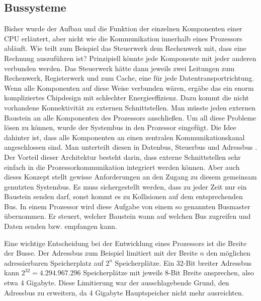 \documentclass[a4paper,12pt]{article}
\begin{document}
\subsection{Bussysteme}
Bisher wurde der Aufbau und die Funktion der einzelnen Komponenten einer CPU erläutert, aber nicht wie die Kommunikation innerhalb eines Prozessors abläuft. Wie teilt zum Beispiel das Steuerwerk dem Rechenwerk mit, dass eine Rechnung auszuführen ist? Prinzipiell könnte jede Komponente mit jeder anderen verbunden werden. Das Steuerwerk hätte dann jeweils zwei Leitungen zum Rechenwerk, Registerwerk und zum Cache, eine für jede Datentransportrichtung. Wenn alle Komponenten auf diese Weise verbunden wären, ergäbe das ein enorm kompliziertes Chipdesign mit schlechter Energieeffizienz. Dazu kommt die nicht vorhandene Konnektivität zu externen Schnittstellen. Man müsste jeden externen Baustein an alle Komponenten des Prozessors anschließen\cite{mikroprozessortechnik2011}. Um all diese Probleme lösen zu können, wurde der Systembus in den Prozessor eingefügt. Die Idee dahinter ist, dass alle Komponenten an einen zentralen Kommunikationskanal angeschlossen sind. Man unterteilt diesen in Datenbus, Steuerbus und Adressbus \cite[S.62]{mikroprozessortechnik2011}. Der Vorteil dieser Architektur besteht darin, dass externe Schnittstellen sehr einfach in die Prozessorkommunikation integriert werden können. Aber auch dieses Konzept stellt gewisse Anforderungen an den Zugang zu diesem gemeinsam genutzten Systembus. Es muss sichergestellt werden, dass zu jeder Zeit nur ein Baustein senden darf, sonst kommt es zu Kollisionen auf dem entsprechenden Bus. In einem Prozessor wird diese Aufgabe von einem so genannten Busmaster übernommen. Er steuert, welcher Baustein wann auf welchen Bus zugreifen  und Daten senden bzw. empfangen kann.
\par\smallskip\noindent
Eine wichtige Entscheidung bei der Entwicklung eines Prozessors ist die Breite der Busse. Der Adressbus zum Beispiel limitiert mit der Breite $n$ den möglichen adressierbaren Speicherplatz auf $2^n$ Speicherplätze. Ein 32-Bit breiter Adressbus kann $2^{32} = 4.294.967.296$ Speicherplätze mit jeweils 8-Bit Breite ansprechen, also etwa 4 Gigabyte. Diese Limitierung war der ausschlagebende Grund, den Adressbus zu erweitern, da 4 Gigabyte Hauptspeicher nicht mehr ausreichten. 


\newpage
\end{document}
